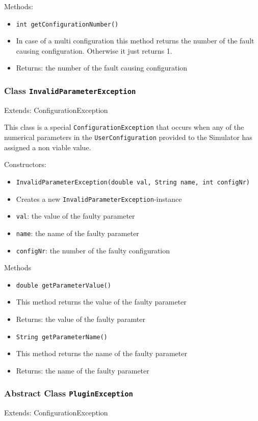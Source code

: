 \documentclass[parskip=full,11pt]{scrartcl}
\begin{document}
Methods:

\begin{itemize} \itemsep -10pt
	\item \texttt{int getConfigurationNumber()}
	\item[] In case of a multi configuration this method returns the number of the fault causing configuration. Otherwise it just returns 1.
	\item[] Returns: the number of the fault causing configuration
\end{itemize}

\subsubsection{Class \texttt{InvalidParameterException}}
Extends: ConfigurationException

This class is a special \texttt{ConfigurationException} that occurs when any of the numerical parameters in the \texttt{UserConfiguration} provided to the Simulator has assigned a non viable value.

Constructors:
\begin{itemize} \itemsep -10pt
	\item \texttt{InvalidParameterException(double val, String name, int configNr)}
	\item[] Creates a new \texttt{InvalidParameterException}-instance
	\item[] \texttt{val}: the value of the faulty parameter
	\item[] \texttt{name}: the name of the faulty parameter
	\item[] \texttt{configNr}: the number of the faulty configuration
\end{itemize}

Methods
\begin{itemize}\itemsep -10pt
	\item \texttt{double getParameterValue()}
	\item[] This method returns the value of the faulty parameter
	\item[] Returns: the value of the faulty paramter
	\item \texttt{String getParameterName()}
	\item[] This method returns the name of the faulty parameter
	\item[] Returns: the name of the faulty parameter
\end{itemize}

\subsubsection{Abstract Class \texttt{PluginException}}
Extends: ConfigurationException
 
\end{document}
